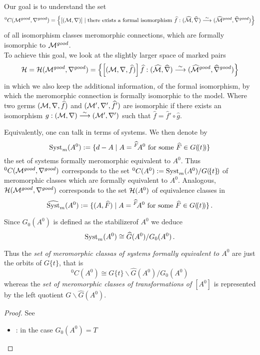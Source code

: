 Our goal is to understand the set
\begin{align*}
  {}^0C(\mathcal{M}^{good},\nabla^{good})=\left\{
    \left[(\mathcal{M},\nabla)\right]
      \mid \text{there exists a formal isomorphism }
      \widehat f:(\widehat{\mathcal{M}},\widehat\nabla)
        \overset{\sim}\longrightarrow
        (\widehat{\mathcal{M}}^{good},\widehat\nabla^{good})
  \right\}
\end{align*}
of all isomorphism classes meromorphic connections, which are formally
isomorphic to $\mathcal{M}^{good}$.
\\To achieve this goal, we look at the slightly larger space of marked pairs
\[
  \mathcal{H}=\mathcal{H}(\mathcal{M}^{good},\nabla^{good})=\left\{
    \left[(\mathcal{M},\nabla,\widehat f)\right]
      \widehat f:(\widehat{\mathcal{M}},\widehat\nabla)
        \overset{\sim}\longrightarrow
        (\widehat{\mathcal{M}}^{good},\widehat\nabla^{good})
  \right\}
\]
in which we also keep the additional information, of the formal isomorphism, by
which the meromorphic connection is formally isomorphic to the model.
Where two germs $(\mathcal{M},\nabla,\widehat f)$ and $(\mathcal{M}',\nabla',\widehat f')$ are
isomorphic if there exists an isomorphism
$g:(\mathcal{M},\nabla)\overset{\sim}\longrightarrow(\mathcal{M}',\nabla')$ such that
$\hat f=\hat f'\circ \hat g$.
\begin{comment}
  \cite[111]{sabbah2007isomonodromic}:\dots it is important to remark that such
  an isomorphism is then unique.
\end{comment}

Equivalently, one can talk in terms of systems. We then denote by 
\[
  \operatorname{Syst}_m(A^0):=\{d-A
    \mid A={}^{\widehat F}\!A^0 \text{ for some } \widehat F\in G(\!(t)\!)\}
\]
the set of systems formally meromorphic equivalent to $A^0$.
Thus ${}^0C(\mathcal{M}^{good},\nabla^{good})$ corresponds to
the set ${}^0C(A^0):=\operatorname{Syst}_m(A^0)/G(\!\{t\}\!)$ of meromorphic classes which
are formally equivalent to $A^0$.
Analogous, $\mathcal{H}(\mathcal{M}^{good},\nabla^{good})$ corresponds to the set $\mathcal{H}(A^0)$ of
equivalence classes in
\[
  \widehat{\operatorname{Syst}}_m(A^0):=\{(A,\widehat F)
    \mid A={}^{\widehat F}\!A^0 \text{ for some } \widehat F\in G(\!(t)\!)\} \,.
\]

\begin{lem}
  Since $G_0(A^0)$ is defined as the stabilizer\TODO[correct?] of $A^0$ we deduce
  \[
    \operatorname{Syst}_m(A^0)\cong \widehat G(A^0)/G_0(A^0) \,.
  \]
  \begin{cor}
    Thus the \emph{set of meromorphic classas of systems formally equivalent
      to $A^0$} are just the orbits of $G\{t\}$, that is
    \[
      {}^0C(A^0)\cong G\{t\}\backslash\hat G(A^0)/G_0(A^0)
    \]
    whereas the \emph{set of meromorphic classes of transformations of $[A^0]$}
    is represented by the left quotient $G\backslash\hat G(A^0)$.
  \end{cor}
\end{lem}
\begin{proof}
  See
  \begin{itemize}
    \item \cite[6]{thboalch}: in the case $G_0(A^0)=T$
  \end{itemize}
\end{proof}

